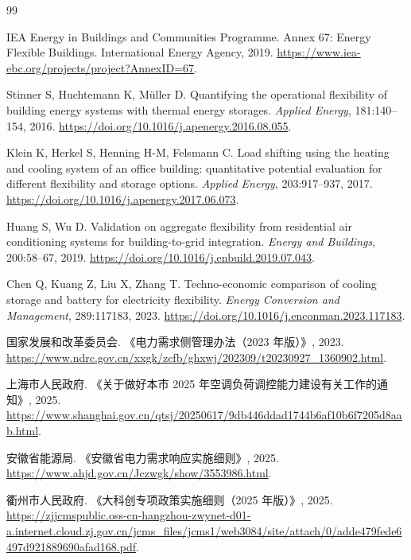 \documentclass[UTF8,fontset=fandol,12pt]{ctexart}
\begin{document}
\clearpage
\begin{thebibliography}{99}

IEA Energy in Buildings and Communities Programme.
\newblock Annex 67: Energy Flexible Buildings.
\newblock International Energy Agency, 2019.
\newblock \url{https://www.iea-ebc.org/projects/project?AnnexID=67}.

Stinner S, Huchtemann K, Müller D.
\newblock Quantifying the operational flexibility of building energy systems
with thermal energy storages.
\newblock \emph{Applied Energy}, 181:140--154, 2016.
\newblock \url{https://doi.org/10.1016/j.apenergy.2016.08.055}.

Klein K, Herkel S, Henning H-M, Felsmann C.
\newblock Load shifting using the heating and cooling system of an office
building: quantitative potential evaluation for different flexibility and
storage options.
\newblock \emph{Applied Energy}, 203:917--937, 2017.
\newblock \url{https://doi.org/10.1016/j.apenergy.2017.06.073}.

Huang S, Wu D.
\newblock Validation on aggregate flexibility from residential air
conditioning systems for building-to-grid integration.
\newblock \emph{Energy and Buildings}, 200:58--67, 2019.
\newblock \url{https://doi.org/10.1016/j.enbuild.2019.07.043}.

Chen Q, Kuang Z, Liu X, Zhang T.
\newblock Techno-economic comparison of cooling storage and battery for
electricity flexibility.
\newblock \emph{Energy Conversion and Management}, 289:117183, 2023.
\newblock \url{https://doi.org/10.1016/j.enconman.2023.117183}.

国家发展和改革委员会.
\newblock 《电力需求侧管理办法（2023 年版）》, 2023.
\newblock \url{https://www.ndrc.gov.cn/xxgk/zcfb/ghxwj/202309/t20230927_1360902.html}.

上海市人民政府.
\newblock 《关于做好本市 2025 年空调负荷调控能力建设有关工作的通知》,
2025.
\newblock \url{https://www.shanghai.gov.cn/qtsj/20250617/9db446ddad1744b6af10b6f7205d8aab.html}.

安徽省能源局.
\newblock 《安徽省电力需求响应实施细则》, 2025.
\newblock \url{https://www.ahjd.gov.cn/Jczwgk/show/3553986.html}.

衢州市人民政府.
\newblock 《大科创专项政策实施细则（2025 年版）》, 2025.
\newblock \url{https://zjjcmspublic.oss-cn-hangzhou-zwynet-d01-a.internet.cloud.zj.gov.cn/jcms_files/jcms1/web3084/site/attach/0/adde479fede6497d921889690afad168.pdf}.


\end{thebibliography}
\end{document}
